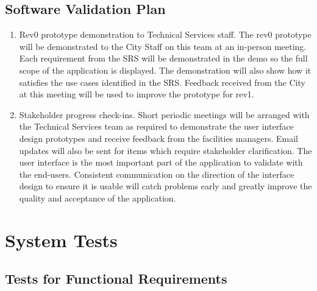 \documentclass[12pt, titlepage]{article}
\begin{document}

\subsection{Software Validation Plan}

\begin{enumerate}
  \item Rev0 prototype demonstration to Technical Services staff. The rev0
    prototype will be demonstrated to the City Staff on this team at
    an in-person
    meeting. Each requirement from the SRS will be demonstrated in
    the demo so the
    full scope of the application is displayed. The demonstration will also show
    how it satisfies the use cases identified in the SRS. Feedback
    received from the
    City at this meeting will be used to improve the prototype for rev1.

  \item Stakeholder progress check-ins. Short periodic meetings will be arranged
    with the Technical Services team as required to demonstrate the
    user interface
    design prototypes and receive feedback from the facilities
    managers. Email updates
    will also be sent for items which require stakeholder
    clarification. The user interface is the most important part of
    the application to validate with the end-users.
    Consistent communication on the direction of the interface design
    to ensure it
    is usable will catch problems early and greatly improve the quality and
    acceptance of the application.
\end{enumerate}

\section{System Tests}


\subsection{Tests for Functional Requirements}

\end{document}
